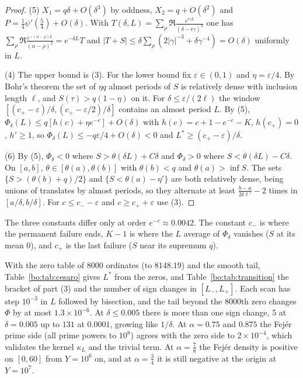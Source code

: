 \begin{proof}
(5) $X_1=q\delta+O(\delta^3)$ by oddness, $X_2=q+O(\delta^2)$ and $P=\frac14\psi'(\frac54)+O(\delta)$. With $T(\delta,L)=\sum_\rho\Re\frac{e^{i\gamma L}}{(\delta-i\gamma)^2}$ one has $\sum_\rho\Re\frac{e^{-(\alpha-\rho)L}}{(\alpha-\rho)^2}=e^{-\delta L}T$ and $|T+S|\le\delta\sum_\rho(2|\gamma|^{-3}+\delta\gamma^{-4})=O(\delta)$ uniformly in $L$.

(4) The upper bound is (3). For the lower bound fix $\varepsilon\in(0,1)$ and $\eta=\varepsilon/4$. By Bohr's theorem the set of $\eta q$ almost periods of $S$ is relatively dense with inclusion length $\ell$, and $S(\tau)>q(1-\eta)$ on it. For $\delta\le\varepsilon/(2\ell)$ the window $[(c_+-\varepsilon)/\delta,(c_+-\varepsilon/2)/\delta]$ contains an almost period $L$. By (5), $\Phi_\delta(L)\le q[h(c)+\eta e^{-c}]+O(\delta)$ with $h(c)=c+1-e^{-c}-K$, $h(c_+)=0$, $h'\ge1$, so $\Phi_\delta(L)\le-q\varepsilon/4+O(\delta)<0$ and $L^*\ge(c_+-\varepsilon)/\delta$.

(6) By (5), $\Phi_\delta<0$ where $S>\theta(\delta L)+C\delta$ and $\Phi_\delta>0$ where $S<\theta(\delta L)-C\delta$. On $[a,b]$, $\theta\in[\theta(a),\theta(b)]$ with $\theta(b)<q$ and $\theta(a)>\inf S$. The sets $\{S>(\theta(b)+q)/2\}$ and $\{S<\theta(a)-\eta'\}$ are both relatively dense, being unions of translates by almost periods, so they alternate at least $\frac{b-a}{2\delta\ell'}-2$ times in $[a/\delta,b/\delta]$. For $c\le c_--\varepsilon$ and $c\ge c_++\varepsilon$ use (3).
\end{proof}

The three constants differ only at order $e^{-c}\approx0.0042$. The constant $c_-$ is where the permanent failure ends, $K-1$ is where the $L$ average of $\Phi_\delta$ vanishes ($S$ at its mean $0$), and $c_+$ is the last failure ($S$ near its supremum $q$).

\begin{remark}[Computation]\label{bo:comp:cesaro}
With the zero table of $8000$ ordinates (to $8148.19$) and the smooth tail, Table~\ref{bo:tab:cesaro} gives $L^*$ from the zeros, and Table~\ref{bo:tab:transition} the bracket of part (3) and the number of sign changes in $[L_-,L_+]$. Each scan has step $10^{-3}$ in $L$ followed by bisection, and the tail beyond the $8000$th zero changes $\Phi$ by at most $1.3\times10^{-6}$. At $\delta\le0.005$ there is more than one sign change, $5$ at $\delta=0.005$ up to $131$ at $0.0001$, growing like $1/\delta$. At $\alpha=0.75$ and $0.875$ the Fej\'er prime side (all prime powers to $10^8$) agrees with the zero side to $2\times10^{-4}$, which validates the kernel $\kappa_L$ and the trivial term. At $\alpha=\frac78$ the Fej\'er density is positive on $[0,60]$ from $Y=10^6$ on, and at $\alpha=\frac34$ it is still negative at the origin at $Y=10^7$. %
\end{remark}

